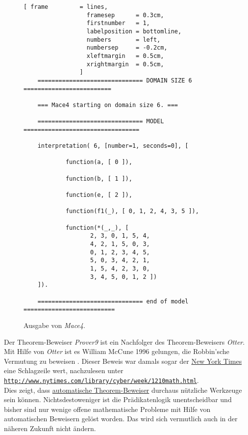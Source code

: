 \begin{figure}[!ht]
\centering
\begin{Verbatim}[ frame         = lines, 
                  framesep      = 0.3cm, 
                  firstnumber   = 1,
                  labelposition = bottomline,
                  numbers       = left,
                  numbersep     = -0.2cm,
                  xleftmargin   = 0.5cm,
                  xrightmargin  = 0.5cm,
                ]
    ============================== DOMAIN SIZE 6 =========================
    
    === Mace4 starting on domain size 6. ===
    
    ============================== MODEL =================================
    
    interpretation( 6, [number=1, seconds=0], [
    
            function(a, [ 0 ]),
    
            function(b, [ 1 ]),
    
            function(e, [ 2 ]),
    
            function(f1(_), [ 0, 1, 2, 4, 3, 5 ]),
    
            function(*(_,_), [
    			   2, 3, 0, 1, 5, 4,
    			   4, 2, 1, 5, 0, 3,
    			   0, 1, 2, 3, 4, 5,
    			   5, 0, 3, 4, 2, 1,
    			   1, 5, 4, 2, 3, 0,
    			   3, 4, 5, 0, 1, 2 ])
    ]).
    
    ============================== end of model ==========================
\end{Verbatim}
\vspace*{-0.3cm}
\caption{Ausgabe von \textsl{Mace4}.}
\label{fig:group.out}
\end{figure}

\remark
Der Theorem-Beweiser \textsl{Prover9} ist ein Nachfolger des Theorem-Beweisers \textsl{Otter}.  Mit Hilfe von
\textsl{Otter} ist es William McCune 1996 gelungen, die Robbin'sche Vermutung zu beweisen \cite{mccune:1997}.
Dieser Beweis war damals sogar der \href{http://www.nytimes.com/}{New York Times} eine Schlagzeile wert,
nachzulesen unter
\\[0.2cm]
\hspace*{1.3cm}
\href{http://www.nytimes.com/library/cyber/week/1210math.html}{\texttt{http://www.nytimes.com/library/cyber/week/1210math.html}}.
\\[0.2cm]
Dies zeigt, dass \href{https://en.wikipedia.org/wiki/Automated_theorem_proving}{automatische Theorem-Beweiser}
durchaus nützliche Werkzeuge sein können.  Nichtsdestoweniger ist die Prädikatenlogik unentscheidbar und bisher
sind  nur wenige offene mathematische Probleme mit Hilfe von automatischen Beweisern gelöst worden.  Das wird
sich vermutlich auch in der näheren Zukunft nicht ändern.  \eox


